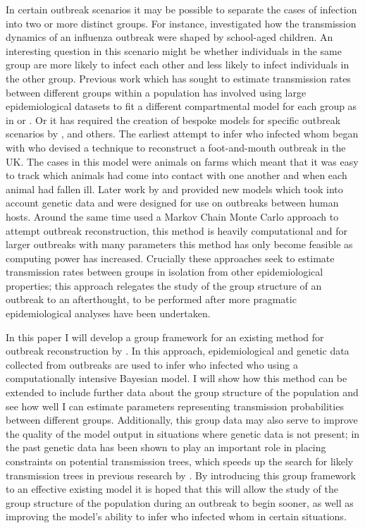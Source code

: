 \documentclass[11pt,a4paper]{report}
\begin{document}
In certain outbreak scenarios it may be possible to separate the cases of infection into two or more distinct groups. For instance, \citet{Cauchemez11} investigated how the transmission dynamics of an influenza outbreak were shaped by school-aged children. An interesting question in this scenario might be whether individuals in the same group are more likely to infect each other and less likely to infect individuals in the other group. Previous work which has sought to estimate transmission rates between different groups within a population has involved using large epidemiological datasets to fit a different compartmental model for each group as in \citet{ONeill02} or \citet{Cauchemez04}. Or it has required the creation of bespoke models for specific outbreak scenarios by \citet{Cottam08}, \citet{Ypma13} and others. The earliest attempt to infer who infected whom began with \citet{Haydon03} who devised a technique to reconstruct a foot-and-mouth outbreak in the UK. The cases in this model were animals on farms which meant that it was easy to track which animals had come into contact with one another and when each animal had fallen ill. Later work by \citet{Cottam08} and \citet{Ypma13} provided new models which took into account genetic data and were designed for use on outbreaks between human hosts. Around the same time \citet{Morelli12} used a Markov Chain Monte Carlo approach to attempt outbreak reconstruction, this method is heavily computational and for larger outbreaks with many parameters this method has only become feasible as computing power has increased. Crucially these approaches seek to estimate transmission rates between groups in isolation from other epidemiological properties; this approach relegates the study of the group structure of an outbreak to an afterthought, to be performed after more pragmatic epidemiological analyses have been undertaken.

In this paper I will develop a group framework for an existing method for outbreak reconstruction by \citet{outbrkr}. In this approach, epidemiological and genetic data collected from outbreaks are used to infer who infected who using a computationally intensive Bayesian model. I will show how this method can be extended to include further data about the group structure of the population and see how well I can estimate parameters representing transmission probabilities between different groups. Additionally, this group data may also serve to improve the quality of the model output in situations where genetic data is not present; in the past genetic data has been shown to play an important role in placing constraints on potential transmission trees, which speeds up the search for likely transmission trees in previous research by \citet{outbrkr}. By introducing this group framework to an effective existing model it is hoped that this will allow the study of the group structure of the population during an outbreak to begin sooner, as well as improving the model's ability to infer who infected whom in certain situations.
\end{document}
